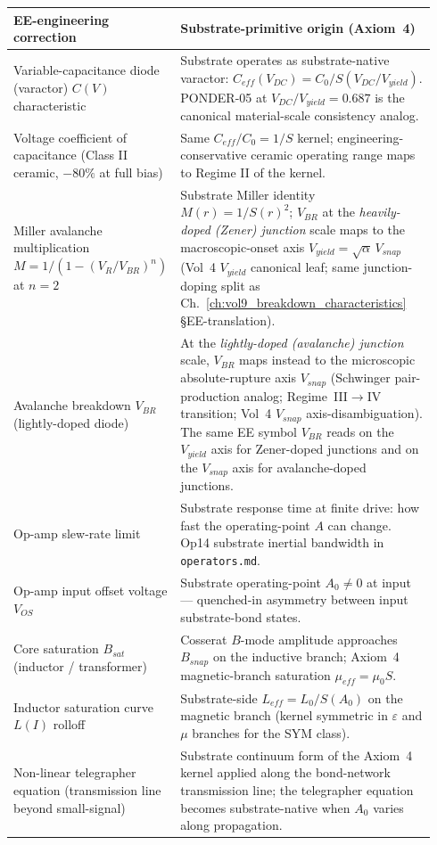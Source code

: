 \begin{table}[htbp]
\centering\small
\begin{tabular}{p{0.32\linewidth} p{0.62\linewidth}}
\toprule
\textbf{EE-engineering correction} & \textbf{Substrate-primitive origin (Axiom~4)} \\
\midrule
Variable-capacitance diode (varactor) $C(V)$ characteristic & Substrate operates as substrate-native varactor: $C_{eff}(V_{DC}) = C_0/S(V_{DC}/V_{yield})$. PONDER-05 at $V_{DC}/V_{yield} = 0.687$ is the canonical material-scale consistency analog. \\
Voltage coefficient of capacitance (Class II ceramic, $-80\%$ at full bias) & Same $C_{eff}/C_0 = 1/S$ kernel; engineering-conservative ceramic operating range maps to Regime II of the kernel. \\
Miller avalanche multiplication $M = 1/(1 - (V_R/V_{BR})^n)$ at $n = 2$ & Substrate Miller identity $M(r) = 1/S(r)^2$; $V_{BR}$ at the \emph{heavily-doped (Zener) junction} scale maps to the macroscopic-onset axis $V_{yield} = \sqrt{\alpha}\,V_{snap}$ (Vol~4 $V_{yield}$ canonical leaf; same junction-doping split as Ch.~\ref{ch:vol9_breakdown_characteristics} \S EE-translation). \\
Avalanche breakdown $V_{BR}$ (lightly-doped diode) & At the \emph{lightly-doped (avalanche) junction} scale, $V_{BR}$ maps instead to the microscopic absolute-rupture axis $V_{snap}$ (Schwinger pair-production analog; Regime~III$\to$IV transition; Vol~4 $V_{snap}$ axis-disambiguation). The same EE symbol $V_{BR}$ reads on the $V_{yield}$ axis for Zener-doped junctions and on the $V_{snap}$ axis for avalanche-doped junctions. \\
Op-amp slew-rate limit & Substrate response time at finite drive: how fast the operating-point $A$ can change. Op14 substrate inertial bandwidth in \texttt{operators.md}. \\
Op-amp input offset voltage $V_{OS}$ & Substrate operating-point $A_0 \neq 0$ at input --- quenched-in asymmetry between input substrate-bond states. \\
Core saturation $B_{sat}$ (inductor / transformer) & Cosserat $B$-mode amplitude approaches $B_{snap}$ on the inductive branch; Axiom~4 magnetic-branch saturation $\mu_{eff} = \mu_0 S$. \\
Inductor saturation curve $L(I)$ rolloff & Substrate-side $L_{eff} = L_0/S(A_0)$ on the magnetic branch (kernel symmetric in $\varepsilon$ and $\mu$ branches for the SYM class). \\
Non-linear telegrapher equation (transmission line beyond small-signal) & Substrate continuum form of the Axiom~4 kernel applied along the bond-network transmission line; the telegrapher equation becomes substrate-native when $A_0$ varies along propagation. \\

\end{tabular}
\end{table}
